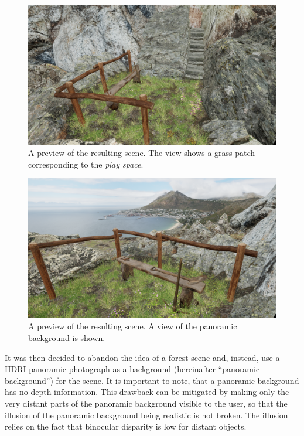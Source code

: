 \begin{figure}[H]
    \centering
    \ifgraphics
        \includegraphics[width=\textwidth]{img/simr-scene-demo-1.png}
    \fi
    \caption{A preview of the resulting scene. The view shows a grass patch corresponding to the \textit{play space}.}\label{fig:scene-preview-1}
\end{figure}

\begin{figure}[H]
    \centering
    \ifgraphics
        \includegraphics[width=\textwidth]{img/simr-scene-demo-2.png}
    \fi
    \caption{A preview of the resulting scene. A view of the panoramic background is shown.}\label{fig:scene-preview-2}
\end{figure}

It was then decided to abandon the idea of a forest scene and, instead, use a \ac{HDRI} panoramic photograph as a background (hereinafter ``panoramic background'') for the scene. It is important to note, that a panoramic background has no depth information. This drawback can be mitigated by making only the very distant parts of the panoramic background visible to the user, so that the illusion of the panoramic background being realistic is not broken. The illusion relies on the fact that binocular disparity is low for distant objects.


